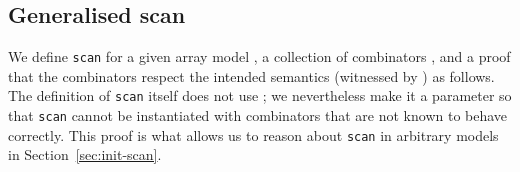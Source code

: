 \subsection{Generalised scan\label{sec:gen-scan}}
We define \texttt{scan} for a given array model , a collection of
combinators , and a proof that the combinators respect the intended
semantics (witnessed by ) as follows.  The definition of \texttt{scan}
itself does not use ; we nevertheless make it a parameter so that
\texttt{scan} cannot be instantiated with combinators that are not known to
behave correctly.  This proof is what allows us to reason about \texttt{scan}
in arbitrary models in Section~\ref{sec:init-scan}.
\begin{code}%
\>[0]\AgdaSpace{}%
\AgdaSpace{}%
\AgdaSymbol{(}\AgdaSpace{}%
\AgdaSymbol{:}\AgdaSpace{}%
\AgdaSymbol{)}\AgdaSpace{}%
\AgdaSymbol{(}\AgdaSpace{}%
\AgdaSymbol{:}\AgdaSpace{}%
\AgdaSpace{}%
\AgdaSymbol{)}\AgdaSpace{}%
\AgdaSymbol{(}\AgdaSpace{}%
\AgdaSymbol{:}\AgdaSpace{}%
\AgdaSpace{}%
\AgdaSpace{}%
\AgdaSymbol{)}\AgdaSpace{}%
\<%
\end{code}
\begin{code}[hide]%
\>[0][@{}l@{\AgdaIndent{1}}]%
\>[2]\AgdaSpace{}%
\AgdaSpace{}%
\<%
\\
%
\>[2]\AgdaSpace{}%
\AgdaSpace{}%
\<%
\\
%
\>[2]\AgdaSpace{}%
\AgdaSpace{}%
\<%
\\
%
\\[\AgdaEmptyExtraSkip]%
%
\>[2]\AgdaSpace{}%
\<%
\\
\>[2][@{}l@{\AgdaIndent{0}}]%
\>[4]\AgdaSpace{}%
\AgdaSymbol{:}\AgdaSpace{}%
\<%
\end{code}
